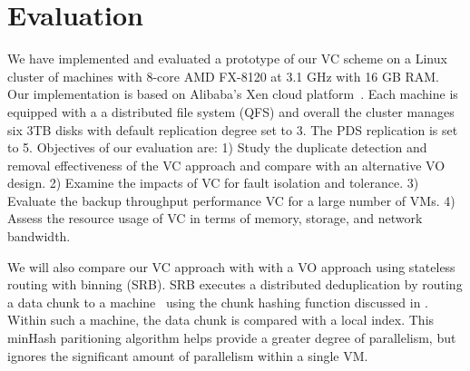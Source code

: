 
\section{Evaluation}
\label{sect:exper}

We have implemented and evaluated a prototype of our VC scheme on a Linux cluster of machines with
8-core AMD FX-8120 at 3.1 GHz with 16 GB RAM. 
Our implementation is based on Alibaba's Xen cloud platform~\cite{Aliyun,WeiZhangIEEE}.
Each machine  is equipped with a 
a distributed file system (QFS) and overall the cluster manages six 3TB disks
with default replication degree set to 3. The PDS replication is set to 5.
Objectives of our evaluation are:
1) Study the duplicate detection and removal effectiveness of the VC approach and compare with an alternative VO
design.
2) Examine the impacts of VC for fault isolation and tolerance. 
3) Evaluate the backup throughput performance VC  for a large number of VMs.
4) Assess the resource usage  of VC in terms of memory, storage, and network bandwidth.


We will also compare our VC approach with  with
a VO approach  using stateless routing with binning (SRB).
SRB executes a distributed deduplication by routing a data chunk to a machine~\cite{ParallelDataDomain}
using  the chunk hashing function discussed in \cite{??}. Within such a machine,
the data chunk is compared with a local index. This minHash paritioning
algorithm helps provide a greater degree of parallelism, but ignores the
significant amount of parallelism within a single VM.

